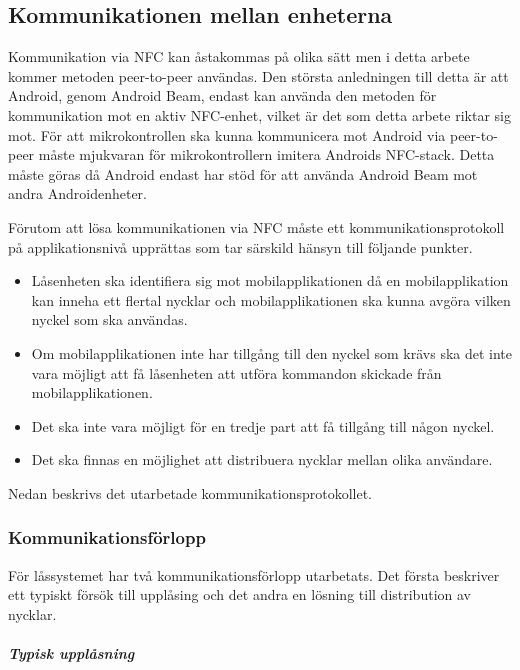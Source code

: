\documentclass[11pt]{article}
\begin{document}
\subsection{Kommunikationen mellan enheterna}
Kommunikation via NFC kan åstakommas på olika sätt men i detta arbete kommer metoden peer-to-peer användas. Den största anledningen till detta är att Android, genom Android Beam, endast kan använda den metoden för kommunikation mot en aktiv NFC-enhet, vilket är det som detta arbete riktar sig mot. För att mikrokontrollen ska kunna kommunicera mot Android via peer-to-peer måste mjukvaran för mikrokontrollern imitera Androids NFC-stack. Detta måste göras då Android endast har stöd för att använda Android Beam mot andra Androidenheter.

Förutom att lösa kommunikationen via NFC måste ett kommunikationsprotokoll på applikationsnivå upprättas som tar särskild hänsyn till följande punkter.

\begin{itemize}
\item Låsenheten ska identifiera sig mot mobilapplikationen då en mobilapplikation kan inneha ett flertal nycklar och mobilapplikationen ska kunna avgöra vilken nyckel som ska användas.
\item Om mobilapplikationen inte har tillgång till den nyckel som krävs ska det inte vara möjligt att få låsenheten att utföra kommandon skickade från mobilapplikationen.
\item Det ska inte vara möjligt för en tredje part att få tillgång till någon nyckel.
\item Det ska finnas en möjlighet att distribuera nycklar mellan olika användare.
\end{itemize}

Nedan beskrivs det utarbetade kommunikationsprotokollet.

\subsubsection{Kommunikationsförlopp}
För låssystemet har två kommunikationsförlopp utarbetats. Det första beskriver ett typiskt försök till upplåsing och det andra en lösning till distribution av nycklar.

\subparagraph{Typisk upplåsning}
\end{document}
